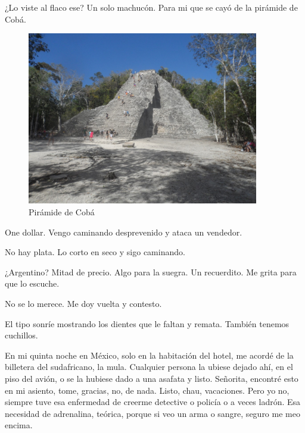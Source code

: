 \documentclass[11pt,twoside,openright,a6paper]{book}
\begin{document}
¿Lo viste al flaco ese? Un solo machucón. Para mi que se cayó de la
pirámide de Cobá.

\begin{figure}[H]
  \centering
    \includegraphics[width=0.9\textwidth]{fotos/2012/coba}
  \caption{Pirámide de Cobá}
  \label{Pirámide de Cobá}
\end{figure}


\vspace{0.5cm}
\hrulefill\hspace{0.2cm} \decofourleft\decofourright \hspace{0.2cm} \hrulefill
\vspace{0.5cm}

One dollar. Vengo caminando desprevenido y ataca un vendedor.

No hay plata. Lo corto en seco y sigo caminando.

¿Argentino? Mitad de precio. Algo para la suegra. Un recuerdito. Me grita
para que lo escuche.

No se lo merece. Me doy vuelta y contesto.

El tipo sonríe mostrando los dientes que le faltan y remata. También
tenemos cuchillos.


\vspace{0.5cm}
\hrulefill\hspace{0.2cm} \decofourleft\decofourright \hspace{0.2cm} \hrulefill
\vspace{0.5cm}

En mi quinta noche en México, solo en la habitación del hotel, me acordé
de la billetera del sudafricano, la mula. Cualquier persona la ubiese
dejado ahí, en el piso del avión, o se la hubiese dado a una asafata
y listo. Señorita, encontré esto en mi asiento, tome, gracias, no, de
nada. Listo, chau, vacaciones. Pero yo no, siempre tuve esa enfermedad de
creerme detective o policía o a veces ladrón. Esa necesidad de adrenalina,
teórica, porque si veo un arma o sangre, seguro me meo encima.
\end{document}
